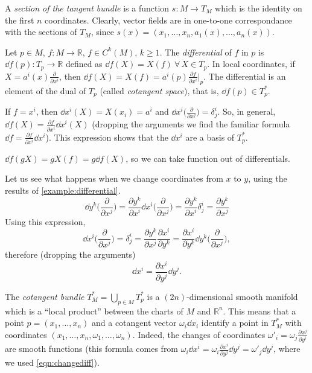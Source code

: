 \documentclass[a4paper,12pt]{book}
\begin{document}
\begin{definition}
A \emph{section of the tangent bundle} is a function $s\colon M\to T_M$ which is the identity on the first $n$ coordinates. Clearly, vector fields are in one-to-one correspondance with the sections of $T_M$, since $s(x)=(x_1,\ldots,x_n,a_1(x),\ldots,a_n(x))$.
\end{definition}

\begin{definition}
Let $p\in M$, $f\colon M\to \mathbb R$, $f\in C^k(M)$, $k\ge1$. The \emph{differential} of $f$ in $p$ is $\dd f(p)\colon T_p\to\mathbb R$ defined as $\dd f(X)=X(f)\ \forall\,X\in T_p$. In local coordinates, if $X=a^i(x)\frac{\partial}{\partial x^i}$, then $\dd f(X)=X(f)=a^i(p)\frac{\partial f}{\partial x^i}\big|_p$. The differential is an element of the dual of $T_p$ (called \emph{cotangent space}), that is, $\dd f(p)\in T_p^*$.
\end{definition}

\begin{example}
\label{example:differential}
If $f=x^i$, then $\dd x^i(X)=X(x_i)=a^i$ and $\dd x^i\bigl(\frac{\partial}{\partial x^j}\bigr)=\delta^i_j$. So, in general, $\dd f(X)=\frac{\partial f}{\partial x^i}\dd x^i(X)$ (dropping the arguments we find the familiar formula $\dd f=\frac{\partial f}{\partial x^i}\dd x^i$). This expression shows that the $\dd x^i$ are a basis of $T_p^*$.
\end{example}

\begin{example}
$\dd f(gX)=gX(f)=g\dd f(X)$, so we can take function out of differentials.
\end{example}

Let us see what happens when we change coordinates from $x$ to $y$, using the results of \cref{example:differential}.
\[\dd y^k\biggl(\frac{\partial}{\partial x^j}\biggr)=\frac{\partial y^k}{\partial x^i}\dd x^i\biggl(\frac{\partial}{\partial x^j}\biggr)=\frac{\partial y^k}{\partial x^i}\delta^i_j=\frac{\partial y^k}{\partial x^j}\]
Using this expression,
\[\dd x^i\biggl(\frac{\partial}{\partial x^j}\biggr)=\delta^i_j=\frac{\partial y^k}{\partial x^j}\frac{\partial x^i}{\partial y^k}=\frac{\partial x^i}{\partial y^k}\dd y^k\biggl(\frac{\partial}{\partial x^j}\biggr),\]
therefore (dropping the arguments)
\begin{equation}
\dd x^i=\frac{\partial x^i}{\partial y^j}\dd y^j.
\label{eqn:changediff}
\end{equation}

\begin{definition}
The \emph{cotangent bundle} $T_M^*=\bigcup_{p\in M}T_p^*$ is a $(2n)$-dimensional smooth manifold which is a ``local product'' between the charts of $M$ and $\mathbb R^n$. This means that a point $p=(x_1,\ldots,x_n)$ and a cotangent vector $\omega_i\dd x_i$ identify a point in $T_M^*$ with coordinates $(x_1,\ldots,x_n,\omega_1,\ldots,\omega_n)$. Indeed, the changes of coordinates $\omega'_i=\omega_j\frac{\partial x^j}{\partial y^i}$ are smooth functions (this formula comes from $\omega_i\dd x^i=\omega_i\frac{\partial x^i}{\partial y^j}\dd y^j=\omega'_j\dd y^j$, where we used \cref{eqn:changediff}).
\end{definition}
\end{document}
